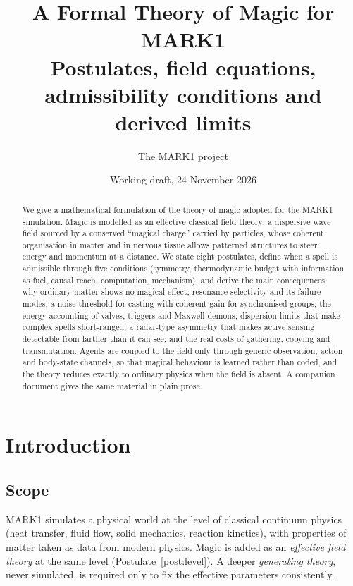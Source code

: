 \documentclass[11pt,a4paper]{article}
\title{A Formal Theory of Magic for MARK1\\[4pt]
\large Postulates, field equations, admissibility conditions and derived limits}
\author{The MARK1 project}
\date{Working draft, 24 November 2026}
\numberwithin{equation}{section}
\theoremstyle{definition}
\theoremstyle{plain}
\theoremstyle{remark}
\begin{document}
\maketitle

\begin{abstract}
\noindent We give a mathematical formulation of the theory of magic adopted for the MARK1 simulation. Magic is modelled as an effective classical field theory: a dispersive wave field sourced by a conserved ``magical charge'' carried by particles, whose coherent organisation in matter and in nervous tissue allows patterned structures to steer energy and momentum at a distance. We state eight postulates, define when a spell is admissible through five conditions (symmetry, thermodynamic budget with information as fuel, causal reach, computation, mechanism), and derive the main consequences: why ordinary matter shows no magical effect; resonance selectivity and its failure modes; a noise threshold for casting with coherent gain for synchronised groups; the energy accounting of valves, triggers and Maxwell demons; dispersion limits that make complex spells short-ranged; a radar-type asymmetry that makes active sensing detectable from farther than it can see; and the real costs of gathering, copying and transmutation. Agents are coupled to the field only through generic observation, action and body-state channels, so that magical behaviour is learned rather than coded, and the theory reduces exactly to ordinary physics when the field is absent. A companion document gives the same material in plain prose.
\end{abstract}

\tableofcontents

\section{Introduction}

\subsection{Scope}
MARK1 simulates a physical world at the level of classical continuum physics (heat transfer, fluid flow, solid mechanics, reaction kinetics), with properties of matter taken as data from modern physics. Magic is added as an \emph{effective field theory} at the same level (Postulate~\ref{post:level}). A deeper \emph{generating theory}, never simulated, is required only to fix the effective parameters consistently.
\end{document}
